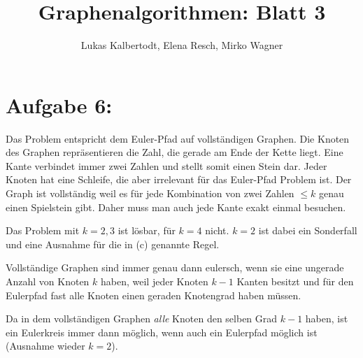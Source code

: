 \documentclass[11pt]{scrartcl} %
\title{Graphenalgorithmen: Blatt 3}
\author{Lukas Kalbertodt, Elena Resch, Mirko Wagner}
\begin{document}
\maketitle
\section*{Aufgabe 6:}
\begin{compactenum}[(a)]
\item Das Problem entspricht dem Euler-Pfad auf vollständigen Graphen. Die Knoten des Graphen repräsentieren die Zahl, die gerade am Ende der Kette liegt. Eine Kante verbindet immer zwei Zahlen und stellt somit einen Stein dar. Jeder Knoten hat eine Schleife, die aber irrelevant für das Euler-Pfad Problem ist. Der Graph ist vollständig weil es für jede Kombination von zwei Zahlen $\le k$ genau einen Spielstein gibt. Daher muss man auch jede Kante exakt einmal besuchen.
\item Das Problem mit $k=2,3$ ist lösbar, für $k=4$ nicht. $k=2$ ist dabei ein Sonderfall und eine Ausnahme für die in (c) genannte Regel.
\item Vollständige Graphen sind immer genau dann eulersch, wenn sie eine ungerade Anzahl von Knoten $k$ haben, weil jeder Knoten $k-1$ Kanten besitzt und für den Eulerpfad fast alle Knoten einen geraden Knotengrad haben müssen.
\item Da in dem vollständigen Graphen \emph{alle} Knoten den selben Grad $k-1$ haben, ist ein Eulerkreis immer dann möglich, wenn auch ein Eulerpfad möglich ist (Ausnahme wieder $k=2$).
\end{compactenum}
\end{document}

